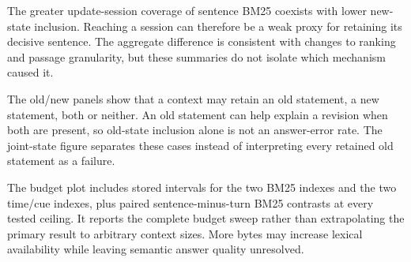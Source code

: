 \documentclass{article}
\begin{document}
The greater update-session coverage of sentence BM25 coexists with lower new-state inclusion. Reaching a session can therefore be a weak proxy for retaining its decisive sentence. The aggregate difference is consistent with changes to ranking and passage granularity, but these summaries do not isolate which mechanism caused it.

The old/new panels show that a context may retain an old statement, a new statement, both or neither. An old statement can help explain a revision when both are present, so old-state inclusion alone is not an answer-error rate. The joint-state figure separates these cases instead of interpreting every retained old statement as a failure.

The budget plot includes stored intervals for the two BM25 indexes and the two time/cue indexes, plus paired sentence-minus-turn BM25 contrasts at every tested ceiling. It reports the complete budget sweep rather than extrapolating the primary result to arbitrary context sizes. More bytes may increase lexical availability while leaving semantic answer quality unresolved.
\end{document}
